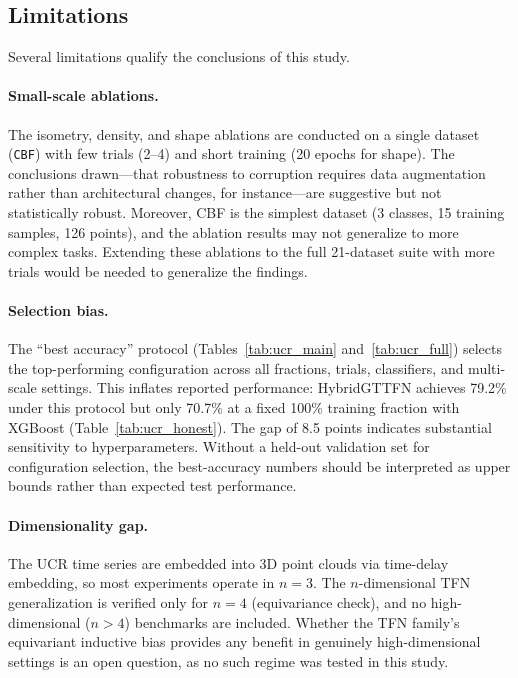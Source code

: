 \documentclass[a4paper,11pt]{article}
\begin{document}
\subsection{Limitations} \label{sec:limitations}

Several limitations qualify the conclusions of this study.

\paragraph{Small-scale ablations.}
The isometry, density, and shape ablations are conducted on a single dataset (\texttt{CBF}) with few trials (2--4) and short training (20 epochs for shape).
The conclusions drawn---that robustness to corruption requires data augmentation rather than architectural changes, for instance---are suggestive but not statistically robust.
Moreover, CBF is the simplest dataset (3 classes, 15 training samples, 126 points), and the ablation results may not generalize to more complex tasks.
Extending these ablations to the full 21-dataset suite with more trials would be needed to generalize the findings.

\paragraph{Selection bias.}
The ``best accuracy'' protocol (Tables~\ref{tab:ucr_main} and~\ref{tab:ucr_full}) selects the top-performing configuration across all fractions, trials, classifiers, and multi-scale settings.
This inflates reported performance: HybridGTTFN achieves 79.2\% under this protocol but only 70.7\% at a fixed 100\% training fraction with XGBoost (Table~\ref{tab:ucr_honest}).
The gap of 8.5 points indicates substantial sensitivity to hyperparameters.
Without a held-out validation set for configuration selection, the best-accuracy numbers should be interpreted as upper bounds rather than expected test performance.

\paragraph{Dimensionality gap.}
The UCR time series are embedded into 3D point clouds via time-delay embedding, so most experiments operate in $n=3$.
The $n$-dimensional TFN generalization is verified only for $n=4$ (equivariance check), and no high-dimensional ($n>4$) benchmarks are included.
Whether the TFN family's equivariant inductive bias provides any benefit in genuinely high-dimensional settings is an open question, as no such regime was tested in this study.
\end{document}
